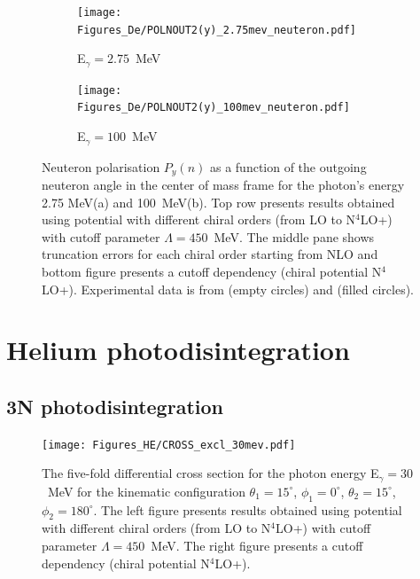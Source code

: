     \begin{figure}[h]
        \centering
        \begin{subfigure}[b]{0.46\textwidth}
            \texttt{[image: Figures\_De/POLNOUT2(y)\_2.75mev\_neuteron.pdf]}
            \caption{\small E$_\gamma = 2.75$~MeV}
            \label{Pn_30_vert}
        \end{subfigure}
        \begin{subfigure}[b]{0.46\textwidth}
            \texttt{[image: Figures\_De/POLNOUT2(y)\_100mev\_neuteron.pdf]}
            \caption{\small E$_\gamma = 100$~MeV}
            \label{Pn_100_vert}
        \end{subfigure}
        \caption{Neuteron polarisation $P_y(n)$ 
        as a function of the outgoing neuteron angle in the center of mass frame 
        for the photon's energy 2.75 MeV(a) and 100~MeV(b).
        Top row presents results obtained using potential
        with different chiral orders (from LO to N$^4$LO+) with cutoff parameter $\Lambda=450$~MeV.
        The middle pane shows truncation errors for each 
        chiral order starting from NLO and
        bottom figure presents a cutoff dependency (chiral potential N$^4$LO+).
        Experimental data is from \cite{Jewell_neuteronpolarization} (empty circles)
        and \cite{CAMERON_neuteronpolarization} (filled circles).}
        \label{Pn_2p75_100}
    \end{figure}


\clearpage

\section{Helium photodisintegration}

\subsection{3N photodisintegration}
    \begin{figure}[h]
        \begin{center}
            \texttt{[image: Figures\_HE/CROSS\_excl\_30mev.pdf]}
            \end{center}
            \caption{The five-fold differential cross section for the photon 
            energy E$_\gamma=30$~MeV for the kinematic configuration
            $\theta_1 = 15^\circ$, $\phi_1 = 0^\circ$,
            $\theta_2 = 15^\circ$, $\phi_2 = 180^\circ$.
            The left figure presents results obtained using potential
            with different chiral orders (from LO to N$^4$LO+) with cutoff parameter $\Lambda=450$~MeV.
            The right figure presents a cutoff dependency (chiral potential N$^4$LO+).}
            \label{CROSS_HE_EXCL_30}
        \end{figure}



